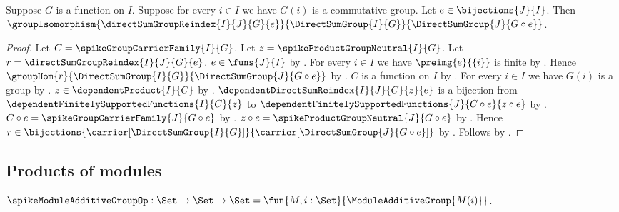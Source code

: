 \begin{theorem}\label{spike_bijective_direct_sum_group_reindex}
    Suppose $G$ is a function on $I$.
    Suppose for every $i\in I$ we have $G(i)$ is a commutative group.
    Let $e\in\bijections{J}{I}$.
    Then
        $\groupIsomorphism
            {\directSumGroupReindex{I}{J}{G}{e}}
            {\DirectSumGroup{I}{G}}
            {\DirectSumGroup{J}{G\circ e}}$.
\end{theorem}
\begin{proof}
    Let $C=\spikeGroupCarrierFamily{I}{G}$.
    Let $z=\spikeProductGroupNeutral{I}{G}$.
    Let $r=\directSumGroupReindex{I}{J}{G}{e}$.
    $e\in\funs{J}{I}$ by .
    For every $i\in I$ we have $\preimg{e}{\{i\}}$ is finite by
        .
    Hence
        $\groupHom{r}{\DirectSumGroup{I}{G}}{
            \DirectSumGroup{J}{G\circ e}}$ by
        .
    $C$ is a function on $I$ by
        .
    For every $i\in I$ we have $G(i)$ is a group by
        .
    $z\in\dependentProduct{I}{C}$ by
        .
    $\dependentDirectSumReindex{I}{J}{C}{z}{e}$ is a bijection from
        $\dependentFinitelySupportedFunctions{I}{C}{z}$ to
        $\dependentFinitelySupportedFunctions
            {J}{C\circ e}{z\circ e}$ by
        .
    $C\circ e=\spikeGroupCarrierFamily{J}{G\circ e}$ by
        .
    $z\circ e=\spikeProductGroupNeutral{J}{G\circ e}$ by
        .
    Hence $r\in\bijections{
        \carrier[\DirectSumGroup{I}{G}]}{
        \carrier[\DirectSumGroup{J}{G\circ e}]}$ by
        .
    Follows by .
\end{proof}

\subsection{Products of modules}

\begin{definition}\label{spike_module_additive_group_op}
    $\spikeModuleAdditiveGroupOp:\Set\to\Set\to\Set
        =\fun{M,i:\Set}{\ModuleAdditiveGroup{M(i)}}$.
\end{definition}


